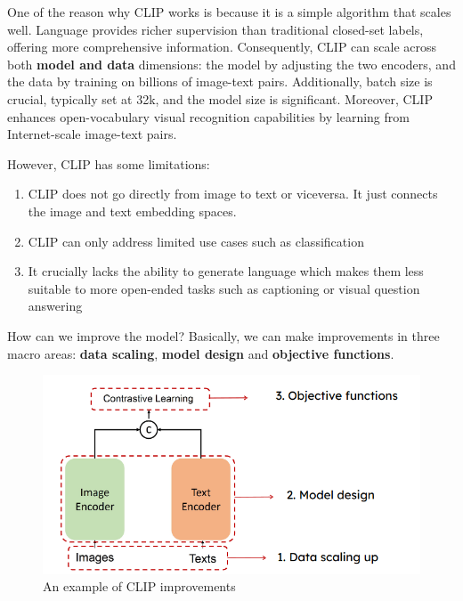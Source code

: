 One of the reason why CLIP works is because it is a simple algorithm that scales well. Language provides richer supervision than traditional closed-set labels, offering more comprehensive information. Consequently, CLIP can scale across both \textbf{model and data} dimensions: the model by adjusting the two encoders, and the data by training on billions of image-text pairs. Additionally, batch size is crucial, typically set at 32k, and the model size is significant. Moreover, CLIP enhances open-vocabulary visual recognition capabilities by learning from Internet-scale image-text pairs.

However, CLIP has some limitations: 
\begin{enumerate}
    \item CLIP does not go directly from image to text or viceversa. It just connects the image and text embedding spaces.

    \vspace{5 pt}

    \item CLIP can only address limited use cases such as classification

    \vspace{5 pt}

    \item It crucially lacks the ability to generate language which makes them less suitable to more open-ended tasks such as captioning or visual question answering
\end{enumerate}

How can we improve the model?
Basically, we can make improvements in three macro areas: \textbf{data scaling}, \textbf{model design} and \textbf{objective functions}.

\begin{figure}[H]
    \centering
    \includegraphics[width=0.75\linewidth]{tikz/CLIP improvements.png}
    \caption{An example of CLIP improvements}
    \label{fig:CLIP-Improvements}
\end{figure}


